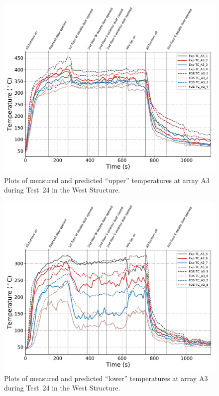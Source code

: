 \begin{figure}[!h]
	\centering
	\includegraphics[width=\columnwidth]{Figures/Plots/Validation/Temperature/Test_24_TC_A3_upper}
	\caption{Plots of measured and predicted ``upper'' temperatures at array A3 during Test~24 in the West Structure.}
	\label{fig:TCA3_upper_data_Test24}
\end{figure}

\begin{figure}[!h]
	\centering
	\includegraphics[width=\columnwidth]{Figures/Plots/Validation/Temperature/Test_24_TC_A3_lower}
	\caption{Plots of measured and predicted ``lower'' temperatures at array A3 during Test~24 in the West Structure.}
	\label{fig:TCA3_lower_data_Test24}
\end{figure}

